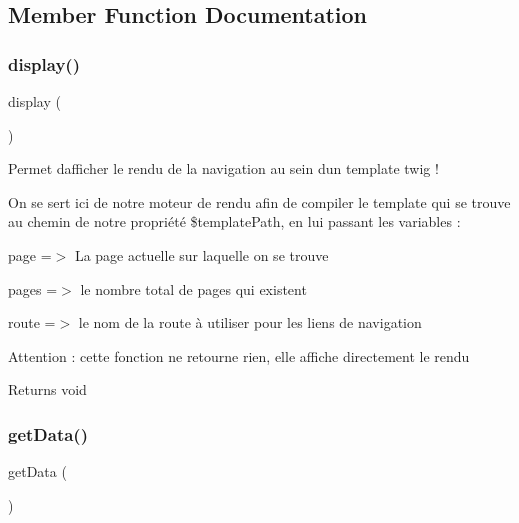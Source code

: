 \subsection{Member Function Documentation}
\mbox{\label{class_app_1_1_service_1_1_pagination_service_a0b9b6e6acd4a839fc7c2f26f96b5cfa8}} 
\subsubsection{\texorpdfstring{display()}{display()}}
{\footnotesize\ttfamily display (\begin{DoxyParamCaption}{ }\end{DoxyParamCaption})}

Permet d\textquotesingle{}afficher le rendu de la navigation au sein d\textquotesingle{}un template twig !

On se sert ici de notre moteur de rendu afin de compiler le template qui se trouve au chemin de notre propriété \$template\+Path, en lui passant les variables \+:
\begin{DoxyItemize}
\item page =$>$ La page actuelle sur laquelle on se trouve
\item pages =$>$ le nombre total de pages qui existent
\item route =$>$ le nom de la route à utiliser pour les liens de navigation
\end{DoxyItemize}

Attention \+: cette fonction ne retourne rien, elle affiche directement le rendu

\begin{DoxyReturn}{Returns}
void 
\end{DoxyReturn}
\mbox{\label{class_app_1_1_service_1_1_pagination_service_a81a67162a6288d78fc4c55283325f0b4}} 
\subsubsection{\texorpdfstring{getData()}{getData()}}
{\footnotesize\ttfamily get\+Data (\begin{DoxyParamCaption}{ }\end{DoxyParamCaption})}

